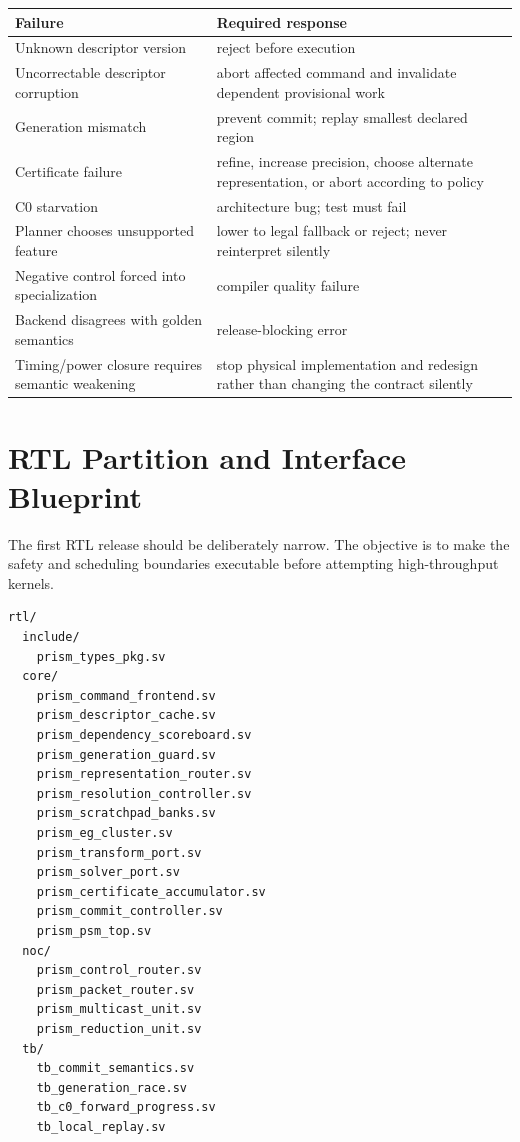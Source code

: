 \documentclass[10pt,letterpaper]{article}
\begin{document}
{{{\begin{table}[h]
\centering
\begin{tabularx}{0.96\linewidth}{p{1.8in}X}
\toprule
\textbf{Failure} & \textbf{Required response}\\
\midrule
Unknown descriptor version & reject before execution\\
Uncorrectable descriptor corruption & abort affected command and invalidate dependent provisional work\\
Generation mismatch & prevent commit; replay smallest declared region\\
Certificate failure & refine, increase precision, choose alternate representation, or abort according to policy\\
C0 starvation & architecture bug; test must fail\\
Planner chooses unsupported feature & lower to legal fallback or reject; never reinterpret silently\\
Negative control forced into specialization & compiler quality failure\\
Backend disagrees with golden semantics & release-blocking error\\
Timing/power closure requires semantic weakening & stop physical implementation and redesign rather than changing the contract silently\\
\bottomrule
\end{tabularx}
\end{table}

\section{RTL Partition and Interface Blueprint}

The first RTL release should be deliberately narrow. The objective is to make the safety and scheduling boundaries executable before attempting high-throughput kernels.

\begin{lstlisting}
rtl/
  include/
    prism_types_pkg.sv
  core/
    prism_command_frontend.sv
    prism_descriptor_cache.sv
    prism_dependency_scoreboard.sv
    prism_generation_guard.sv
    prism_representation_router.sv
    prism_resolution_controller.sv
    prism_scratchpad_banks.sv
    prism_eg_cluster.sv
    prism_transform_port.sv
    prism_solver_port.sv
    prism_certificate_accumulator.sv
    prism_commit_controller.sv
    prism_psm_top.sv
  noc/
    prism_control_router.sv
    prism_packet_router.sv
    prism_multicast_unit.sv
    prism_reduction_unit.sv
  tb/
    tb_commit_semantics.sv
    tb_generation_race.sv
    tb_c0_forward_progress.sv
    tb_local_replay.sv
\end{lstlisting}

}}}
\end{document}
